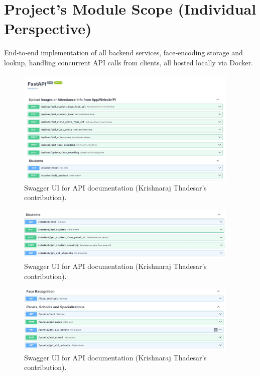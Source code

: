 \documentclass[openany]{report}
\begin{document}
\section{Project’s Module Scope (Individual Perspective)}
End‐to‐end implementation of all backend services, face‐encoding storage and lookup, handling concurrent API calls from clients, all hosted locally via Docker.
\begin{figure}[H]
    \centering
    \includegraphics[width=0.95\textwidth]{../imgs/swagger 1.jpg}
    \caption{Swagger UI for API documentation (Krishnaraj Thadesar’s contribution).}
    \label{fig:swagger_ui}
\end{figure}
\begin{figure}[H]
    \centering
    \includegraphics[width=0.95\textwidth]{../imgs/swagger 2.jpg}
    \caption{Swagger UI for API documentation (Krishnaraj Thadesar’s contribution).}
    \label{fig:swagger_ui}
\end{figure}
\begin{figure}[H]
    \centering
    \includegraphics[width=0.95\textwidth]{../imgs/swagger 3.jpg}
    \caption{Swagger UI for API documentation (Krishnaraj Thadesar’s contribution).}
    \label{fig:swagger_ui}
\end{figure}
\end{document}
